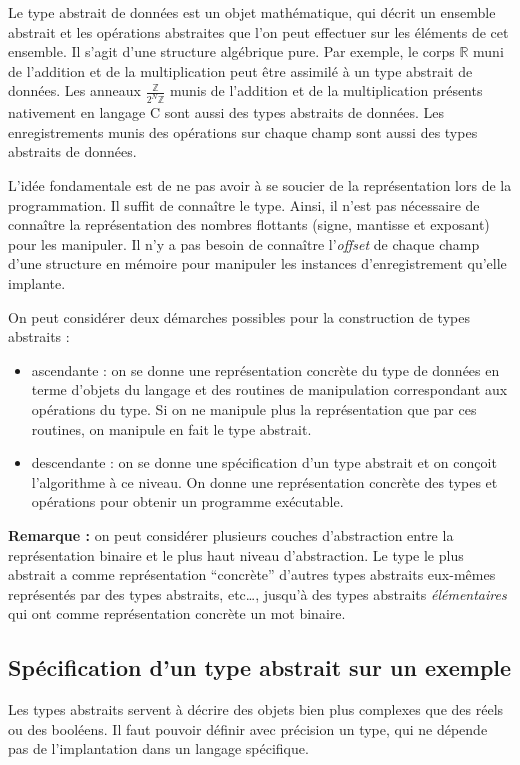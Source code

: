 \documentclass[../../../main.tex]{subfiles}
\begin{document}
Le type abstrait de données est un objet mathématique, qui décrit un ensemble abstrait et les opérations abstraites que l'on peut effectuer sur les éléments de cet ensemble. Il s'agit d'une structure algébrique pure. Par exemple, le corps $\mathbb{R}$ muni de l'addition et de la multiplication peut être assimilé à un type abstrait de données. Les anneaux $\frac{\mathbb{Z}}{2^N\mathbb{Z}}$ munis de l'addition et de la multiplication présents nativement en langage C sont aussi des types abstraits de données. Les enregistrements munis des opérations sur chaque champ sont aussi des types abstraits de données.

L'idée fondamentale est de ne pas avoir à se soucier de la représentation lors de la programmation. Il suffit de connaître le type. Ainsi, il n'est pas nécessaire de connaître la représentation des nombres flottants (signe, mantisse et exposant) pour les manipuler. Il n'y a pas besoin de connaître l'\textit{offset} de chaque champ d'une structure en mémoire pour manipuler les instances d'enregistrement qu'elle implante.

On peut considérer deux démarches possibles pour la construction de types abstraits :
\begin{itemize}
	\item ascendante : on se donne une représentation concrète du type de données en terme d'objets du langage et des routines de manipulation correspondant aux opérations du type. Si on ne manipule plus la représentation que par ces routines, on manipule en fait le type abstrait.
	\item descendante : on se donne une spécification d'un type abstrait et on conçoit l'algorithme à ce niveau. On donne une représentation concrète des types et opérations pour obtenir un programme exécutable.
\end{itemize}
\textbf{Remarque :} on peut considérer plusieurs couches d'abstraction entre la représentation binaire et le plus haut niveau d'abstraction. Le type le plus abstrait a comme représentation ``concrète'' d'autres types abstraits eux-mêmes représentés par des types abstraits, etc\dots, jusqu'à des types abstraits \textit{élémentaires} qui ont comme représentation concrète un mot binaire.

\subsection{Spécification d'un type abstrait sur un exemple}
Les types abstraits servent à décrire des objets bien plus complexes que des réels ou des booléens. Il faut pouvoir définir avec précision un type, qui ne dépende pas de l'implantation dans un langage spécifique.
\end{document}
